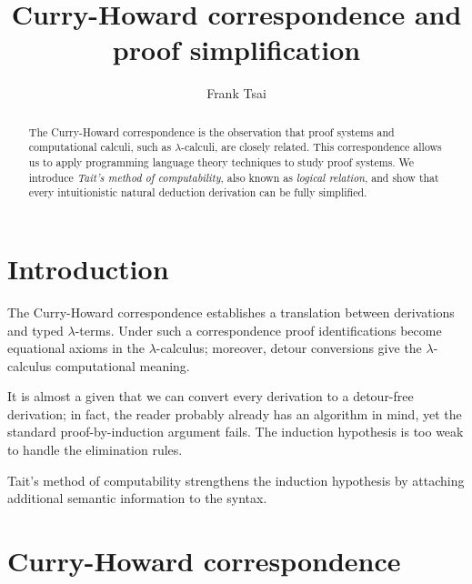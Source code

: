\documentclass[a4paper]{article}
\title{Curry-Howard correspondence and proof simplification}
\author{Frank Tsai}
\begin{document}
\maketitle

\begin{abstract}
  The Curry-Howard correspondence is the observation that proof systems and computational calculi, such as $\lambda$-calculi, are closely related.
  This correspondence allows us to apply programming language theory techniques to study proof systems.
  We introduce \emph{Tait's method of computability}, also known as \emph{logical relation}, and show that every intuitionistic natural deduction derivation can be fully simplified.
\end{abstract}

\section{Introduction}
\label{sec:0000}


The Curry-Howard correspondence establishes a translation between derivations and typed $\lambda$-terms.
Under such a correspondence proof identifications become equational axioms in the $\lambda$-calculus; moreover, detour conversions give the $\lambda$-calculus computational meaning.

It is almost a given that we can convert every derivation to a detour-free derivation; in fact, the reader probably already has an algorithm in mind, yet the standard proof-by-induction argument fails.
The induction hypothesis is too weak to handle the elimination rules.

Tait's method of computability strengthens the induction hypothesis by attaching additional semantic information to the syntax.


\section{Curry-Howard correspondence}
\label{sec:0001}
\end{document}
